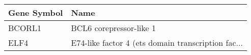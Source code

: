 \begin{tabular}{ll}
\toprule
Gene Symbol &                                               Name \\
\midrule
     BCORL1 &                            BCL6 corepressor-like 1 \\
       ELF4 & E74-like factor 4 (ets domain transcription fac... \\
\bottomrule
\end{tabular}
